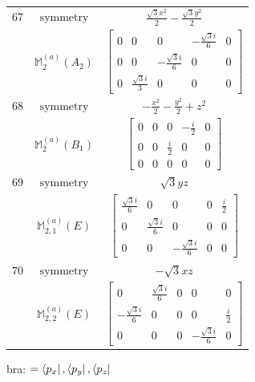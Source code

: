 \documentclass[fleqn,8pt,landscape]{jsarticle}
\begin{document}
\begin{longtable}{ccc}
$ 67 $ & $ \text{symmetry} $ & $ \frac{\sqrt{3} x^{2}}{2} - \frac{\sqrt{3} y^{2}}{2} $ \\
$  $ & $ \mathbb{M}_{2}^{(a)}(A_{2}) $ & $ \begin{bmatrix} 0 & 0 & 0 & - \frac{\sqrt{3} i}{6} & 0 \\ 0 & 0 & - \frac{\sqrt{3} i}{6} & 0 & 0 \\ 0 & \frac{\sqrt{3} i}{3} & 0 & 0 & 0 \end{bmatrix} $ \\ \hline
$ 68 $ & $ \text{symmetry} $ & $ - \frac{x^{2}}{2} - \frac{y^{2}}{2} + z^{2} $ \\
$  $ & $ \mathbb{M}_{2}^{(a)}(B_{1}) $ & $ \begin{bmatrix} 0 & 0 & 0 & - \frac{i}{2} & 0 \\ 0 & 0 & \frac{i}{2} & 0 & 0 \\ 0 & 0 & 0 & 0 & 0 \end{bmatrix} $ \\ \hline
$ 69 $ & $ \text{symmetry} $ & $ \sqrt{3} y z $ \\
$  $ & $ \mathbb{M}_{2,1}^{(a)}(E) $ & $ \begin{bmatrix} \frac{\sqrt{3} i}{6} & 0 & 0 & 0 & \frac{i}{2} \\ 0 & \frac{\sqrt{3} i}{6} & 0 & 0 & 0 \\ 0 & 0 & - \frac{\sqrt{3} i}{6} & 0 & 0 \end{bmatrix} $ \\ \hline
$ 70 $ & $ \text{symmetry} $ & $ - \sqrt{3} x z $ \\
$  $ & $ \mathbb{M}_{2,2}^{(a)}(E) $ & $ \begin{bmatrix} 0 & \frac{\sqrt{3} i}{6} & 0 & 0 & 0 \\ - \frac{\sqrt{3} i}{6} & 0 & 0 & 0 & \frac{i}{2} \\ 0 & 0 & 0 & - \frac{\sqrt{3} i}{6} & 0 \end{bmatrix} $ \\ \hline
\end{longtable}
bra: $=\bra{p_{x}}, \bra{p_{y}}, \bra{p_{z}}$
\end{document}
